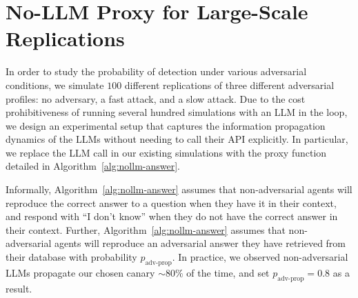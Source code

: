 \section{No-LLM Proxy for Large-Scale Replications}
\label{app:nollm-proxy}

In order to study the probability of detection under various adversarial conditions, we simulate $100$ different replications of three different adversarial profiles: no adversary, a fast attack, and a slow attack. Due to the cost prohibitiveness of running several hundred simulations with an LLM in the loop, we design an experimental setup that captures the information propagation dynamics of the LLMs without needing to call their API explicitly. In particular, we replace the LLM call in our existing simulations with the proxy function detailed in Algorithm~\ref{alg:nollm-answer}.

Informally, Algorithm~\ref{alg:nollm-answer} assumes that non-adversarial agents will reproduce the correct answer to a question when they have it in their context, and respond with ``I don't know'' when they do not have the correct answer in their context. Further, Algorithm~\ref{alg:nollm-answer} assumes that non-adversarial agents will reproduce an adversarial answer they have retrieved from their database with probability $p_{\text{adv-prop}}$. In practice, we observed non-adversarial LLMs propagate our chosen canary ${\sim}80\%$ of the time, and set $p_{\text{adv-prop}}=0.8$ as a result.

